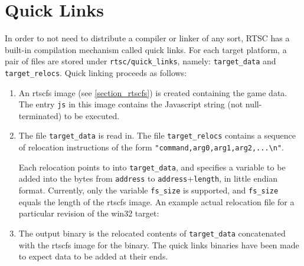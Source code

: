 \documentclass[10pt]{book}
\begin{document}
\section{Quick Links}
\label{section_quick_links}
In order to not need to distribute a compiler or linker of any sort, RTSC has a built-in compilation mechanism called quick links.
For each target platform, a pair of files are stored under \texttt{rtsc/quick\_links}, namely: \texttt{target\_data} and \texttt{target\_relocs}.
Quick linking proceeds as follows:
\begin{enumerate}
\item
An rtscfs image (see \ref{section_rtscfs}) is created containing the game data.
The entry \texttt{js} in this image contains the Javascript string (not null-terminated) to be executed.
\item
The file \texttt{target\_data} is read in.
The file \texttt{target\_relocs} contains a sequence of relocation instructions of the form \texttt{"command,arg0,arg1,arg2,...\textbackslash n"}.

Each relocation points to into \texttt{target\_data}, and specifies a variable to be added into the bytes from \texttt{address} to \texttt{address}+\texttt{length}, in little endian format.
Currently, only the variable \texttt{fs\_size} is supported, and \texttt{fs\_size} equals the length of the rtscfs image.
An example actual relocation file for a particular revision of the win32 target:

\item
The output binary is the relocated contents of \texttt{target\_data} concatenated with the rtscfs image for the binary.
The quick links binaries have been made to expect data to be added at their ends.
\end{enumerate}
\end{document}
